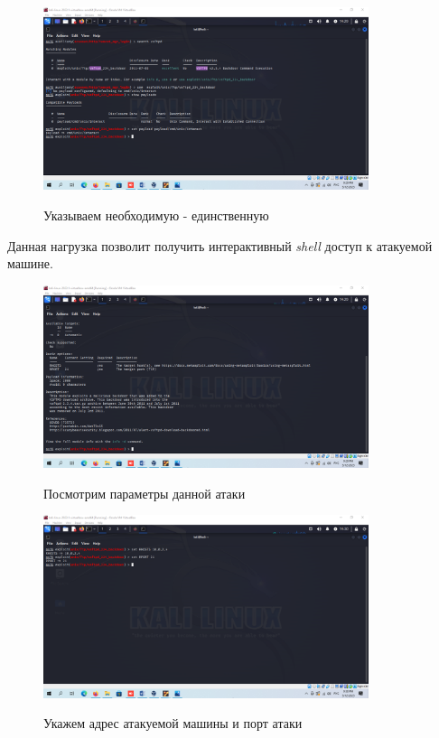 \documentclass[a4paper]{article}
\begin{document}
  \begin{figure}[H]
    \centering
    \includegraphics[width=0.85\textwidth]{04_0063}
    \label{img:63}
    \caption{Указываем необходимую - единственную}
  \end{figure}

  Данная нагрузка позволит получить интерактивный \textit{shell} доступ к атакуемой машине.

  \begin{figure}[H]
    \centering
    \includegraphics[width=0.85\textwidth]{04_0064}
    \label{img:64}
    \caption{Посмотрим параметры данной атаки}
  \end{figure}

  \begin{figure}[H]
    \centering
    \includegraphics[width=0.85\textwidth]{04_0067}
    \label{img:66}
    \caption{Укажем адрес атакуемой машины и порт атаки}
  \end{figure}
\end{document}
